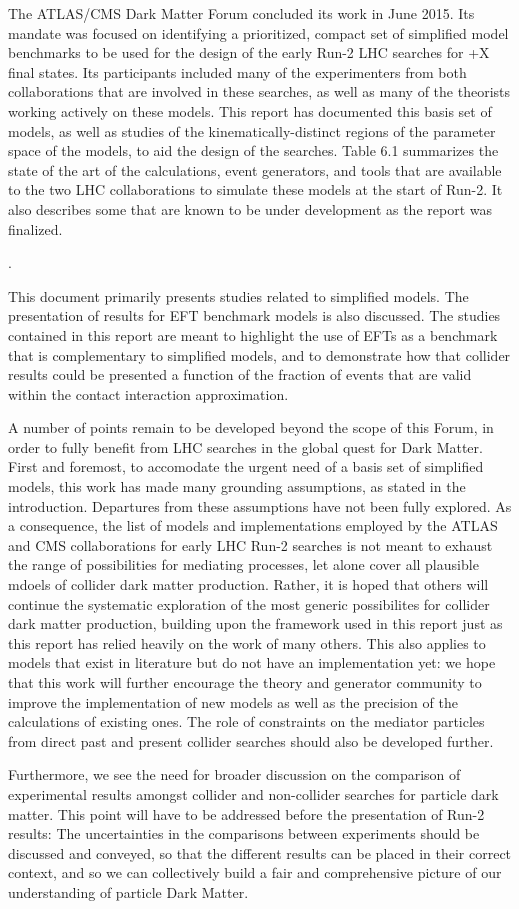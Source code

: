The ATLAS/CMS Dark Matter Forum concluded its work in June 2015. Its mandate was focused on identifying a prioritized, compact set of simplified model benchmarks
to be used for the design of the early Run-2 LHC searches for \MET+X final states. Its participants included many of the experimenters from both collaborations that are involved in these searches, as well as many of the theorists working actively on these models.
This report has documented this basis set of models, as well as studies of the kinematically-distinct regions of the parameter space of the models, to aid the design of the searches.
Table 6.1 summarizes the state of the art of the calculations, event generators, and tools that are available to the two LHC collaborations to simulate these models at the start of Run-2. It also describes some that are known to be under development as the report was finalized.

.

This document primarily presents studies related to simplified models.
The presentation of results for EFT benchmark models is also discussed.
The studies contained in this report are meant to highlight the use of
EFTs as a benchmark that is complementary to simplified models,
and to demonstrate how that collider results could be presented a function of the
fraction of events that are valid within the contact interaction approximation.

A number of points remain to be developed beyond the scope of this Forum,
in order to fully benefit from LHC searches in the global quest for Dark Matter.
First and foremost, to accomodate the urgent need of a basis set of simplified models, 
this work has made many grounding assumptions, as stated in the introduction. Departures from these assumptions have not been fully explored.
As a consequence, the list of models and implementations employed by the ATLAS and CMS collaborations 
for early LHC Run-2 searches is not meant to exhaust the range of possibilities for mediating processes, 
let alone cover all plausible mdoels of collider dark matter production. 
Rather, it is hoped that others will continue the systematic exploration of the most generic possibilites 
for collider dark matter production, building upon the framework used in this report just as this report has 
relied heavily on the work of many others. 
This also applies to models that exist in literature but do not have an implementation yet: we
hope that this work will further encourage the theory and generator community to improve the 
implementation of new models as well as the precision of the calculations of existing ones. 
The role of constraints on the mediator particles
from direct past and present collider searches should also be developed further.

Furthermore, we see the need for broader discussion on the comparison
of experimental results amongst collider and non-collider searches for particle dark matter. 
This point will have to be addressed before the presentation of Run-2 results:
The uncertainties in the comparisons between experiments should be discussed and conveyed, so that the different results
can be placed in their correct context, and so we can collectively build a fair and comprehensive picture of our understanding of particle Dark Matter.
